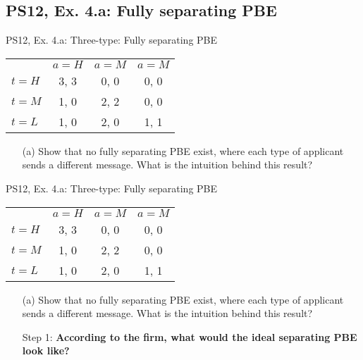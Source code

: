 \subsection{PS12, Ex. 4.a: Fully separating PBE}

\begin{frame}{PS12, Ex. 4.a: Three-type: Fully separating PBE}
    \begin{table}
      \begin{tabular}{l|c|c|c|}
          \multicolumn{1}{c}{} & \multicolumn{1}{c}{$a=H$} & \multicolumn{1}{c}{$a=M$} & \multicolumn{1}{c}{$a=M$} \\\cline{2-4}
          $t=H$ & 3, 3 & 0, 0 & 0, 0 \\\cline{2-4}
          $t=M$ & 1, 0 & 2, 2 & 0, 0 \\\cline{2-4}
          $t=L$ & 1, 0 & 2, 0 & 1, 1 \\\cline{2-4}
      \end{tabular}
    \end{table}\vspace{-8pt}
    \begin{itemize}
      \item[(a)] Show that no fully separating PBE exist, where each type of applicant sends a different message. What is the intuition behind this result?
    \end{itemize}
    \vfill\null
\end{frame}
\begin{frame}{PS12, Ex. 4.a: Three-type: Fully separating PBE}
    \begin{table}
      \begin{tabular}{l|c|c|c|}
          \multicolumn{1}{c}{} & \multicolumn{1}{c}{$a=H$} & \multicolumn{1}{c}{$a=M$} & \multicolumn{1}{c}{$a=M$} \\\cline{2-4}
          $t=H$ & 3, 3 & 0, 0 & 0, 0 \\\cline{2-4}
          $t=M$ & 1, 0 & 2, 2 & 0, 0 \\\cline{2-4}
          $t=L$ & 1, 0 & 2, 0 & 1, 1 \\\cline{2-4}
      \end{tabular}
    \end{table}\vspace{-8pt}
    \begin{itemize}
      \item[(a)] Show that no fully separating PBE exist, where each type of applicant sends a different message. What is the intuition behind this result?
      \item[Step 1:] \textbf{According to the firm, what would the ideal separating PBE look like?}
    \end{itemize}
    \vfill\null
\end{frame}
